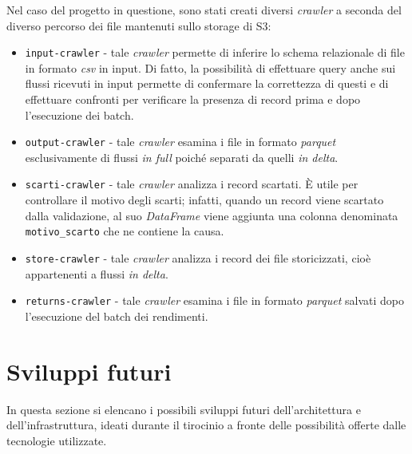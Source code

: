 Nel caso del progetto in questione, sono stati creati diversi \textit{crawler} a seconda del diverso percorso dei file mantenuti sullo storage di S3:
\begin{itemize}
    \item \texttt{input-crawler} - tale \textit{crawler} permette di inferire lo schema relazionale di file in formato \textit{csv} in input.
    Di fatto, la possibilità di effettuare query anche sui flussi ricevuti in input permette di confermare la correttezza di questi e di effettuare confronti per verificare la presenza di record prima e dopo l'esecuzione dei batch.
    \item \texttt{output-crawler} - tale \textit{crawler} esamina i file in formato \textit{parquet} esclusivamente di flussi \textit{in full} poiché separati da quelli \textit{in delta}.
    \item \texttt{scarti-crawler} - tale \textit{crawler} analizza i record scartati.
    È utile per controllare il motivo degli scarti;
    infatti, quando un record viene scartato dalla validazione, al suo \textit{DataFrame} viene aggiunta una colonna denominata \texttt{motivo\_scarto} che ne contiene la causa.
    \item \texttt{store-crawler} - tale \textit{crawler} analizza i record dei file storicizzati, cioè appartenenti a flussi \textit{in delta}.
    \item \texttt{returns-crawler} - tale \textit{crawler} esamina i file in formato \textit{parquet} salvati dopo l'esecuzione del batch dei rendimenti.
\end{itemize}

\section{Sviluppi futuri}\label{sec:future}

In questa sezione si elencano i possibili sviluppi futuri dell'architettura e dell'infrastruttura, ideati durante il tirocinio a fronte delle possibilità offerte dalle tecnologie utilizzate.

